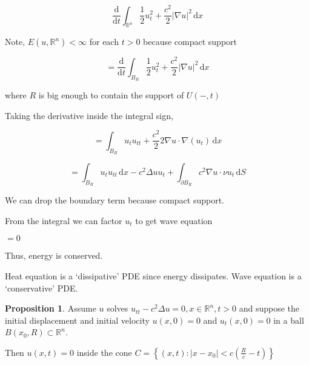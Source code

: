 \documentclass{article}
\theoremstyle{definition}
\newtheorem{proposition}{Proposition}
\begin{document}
\[
    \frac{\mathrm{d}}{\mathrm{d}t} \int_{\mathbb{R}^n}^{} \frac{1}{2} u_t^2 + \frac{c^2}{2} \vert \nabla u \vert ^2 \,\mathrm{d}x 
\]

Note, \(E(u,\mathbb{R}^n) < \infty\) for each \(t > 0\) because compact support

\[
    = \frac{\mathrm{d}}{\mathrm{d}t} \int_{B_R}^{} \frac{1}{2} u_t^2 + \frac{c^2}{2} \vert \nabla u \vert ^2 \,\mathrm{d}x 
\]

where \(R\) is big enough to contain the support of \(U(-,t)\) 

Taking the derivative inside the integral sign,

\[
    = \int_{B_R}^{} u_t u_{t t} + \frac{c^2}{2} 2 \nabla u\cdot\nabla(u_t) \,\mathrm{d}x 
\]

\[
    = \int_{B_R}^{} u_t u_{t t} \,\mathrm{d}x - c^2 \Delta u u_t + \int_{\partial B_R}^{} c^2 \nabla u\cdot\nu u_t \,\mathrm{d}S 
\]

We can drop the boundary term because compact support.

From the integral we can factor \(u_t\) to get wave equation

\(= 0\) 

Thus, energy is conserved.

Heat equation is a `dissipative' PDE since energy dissipates. Wave equation is a `conservative' PDE.

\begin{proposition}
    Assume \(u\) solves \(u_{t t} - c^2 \Delta u = 0, x\in\mathbb{R}^n, t>0\) and suppose the initial displacement and initial velocity \(u(x,0)=0\) and \(u_t(x,0)=0\) in a ball \(B(x_0,R)\subset \mathbb{R}^n\).  

    Then \(u(x,t) = 0\) inside the cone \(C = \left\{ (x,t):\vert x - x_0 \vert < c \left( \frac{R}{c} - t \right)  \right\} \) 
\end{proposition}
\end{document}
